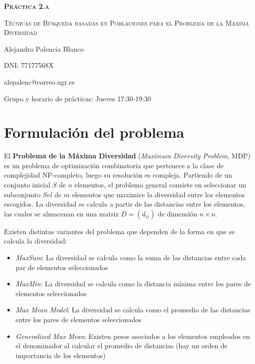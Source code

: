\documentclass[10pt,a4paper]{article}
\begin{document}
\begin{titlepage}
	\centering
	{\bfseries\scshape\Huge Práctica 2.a \par}
	\vspace{3cm}
	{\scshape\Huge Técnicas de Búsqueda basadas en Poblaciones para el Problema de la Máxima Diversidad \par}
	\vfill
	{\Large Alejandro Palencia Blanco \par}
	\vspace{1cm}
	{\Large DNI: 77177568X \par}
	\vspace{1cm}
	{\Large alepalenc@correo.ugr.es \par}
	\vspace{1cm}
	\vfill
	{\Large Grupo y horario de prácticas: Jueves 17:30-19:30 \par}
\end{titlepage}

\newpage

\tableofcontents

\newpage

\section{Formulación del problema}

El \textbf{Problema de la Máxima Diversidad} (\textit{Maximum Diversity Problem}, MDP) es un problema de optimización combinatoria que pertenece a la clase de complejidad NP-completo, luego su resolución es compleja. Partiendo de un conjunto inicial $S$ de $n$ elementos, el problema general consiste en seleccionar un subconjunto $Sel$ de $m$ elementos que maximice la diversidad entre los elementos escogidos. La diversidad se calcula a partir de las distancias entre los elementos, las cuales se almacenan en una matriz $D = (d_{ij})$ de dimensión $n \times n$.

Existen distintas variantes del problema que dependen de la forma en que se calcula la diversidad:

\begin{itemize}
	\item \textit{MaxSum}: La diversidad se calcula como la suma de las
	distancias entre cada par de elementos seleccionados
	\item \textit{MaxMin}: La diversidad se calcula como la distancia
	mínima entre los pares de elementos seleccionados
	\item \textit{Max Mean Model}: La diversidad se calcula como el promedio de
	las distancias entre los pares de elementos seleccionados
	\item \textit{Generalized Max Mean}: Existen pesos asociados a los elementos
	empleados en el denominador al calcular el promedio de
	distancias (hay un orden de importancia de los elementos)
\end{itemize}
\end{document}
